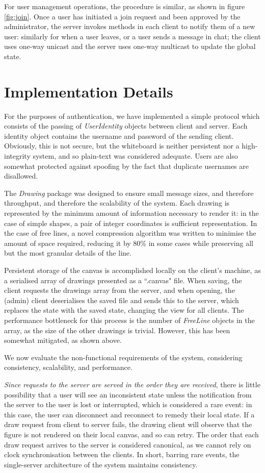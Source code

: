 \documentclass[12pt,a4paper]{article}
\begin{document}
For user management operations, the procedure is similar, as shown in figure \ref{fig:join}. Once a user has initiated a join request and been approved by the administrator, the server invokes methods in each client to notify them of a new user: similarly for when a user leaves, or a user sends a message in chat; the client uses one-way unicast and the server uses one-way multicast to update the global state. 


\section{Implementation Details}

For the purposes of authentication, we have implemented a simple protocol which consists of the passing of \textit{UserIdentity} objects between client and server. Each identity object contains the username and password of the sending client. Obviously, this is not secure, but the whiteboard is neither persistent nor a high-integrity system, and so plain-text was considered adequate. Users are also somewhat protected against spoofing by the fact that duplicate usernames are disallowed.

The \textit{Drawing} package was designed to ensure small message sizes, and therefore throughput, and therefore the scalability of the system. Each drawing is represented by the minimum amount of information necessary to render it: in the case of simple shapes, a pair of integer coordinates is sufficient representation. In the case of free lines, a novel compression algorithm was written to minimise the amount of space required, reducing it by 80\% in some cases while preserving all but the most granular details of the line. 

Persistent storage of the canvas is accomplished locally on the client's machine, as a serialised array of drawings presented as a ``.canvas" file. When saving, the client requests the drawings array from the server, and when opening, the (admin) client deserialises the saved file and sends this to the server, which replaces the state with the saved state, changing the view for all clients. The performance bottleneck for this process is the number of \textit{FreeLine} objects in the array, as the size of the other drawings is trivial. However, this has been somewhat mitigated, as shown above. 

We now evaluate the non-functional requirements of the system, considering consistency, scalability, and performance.

\textit{Since requests to the server are served in the order they are received}, there is little possibility that a user will see an inconsistent state unless the notification from the server to the user is lost or interrupted, which is considered a rare event: in this case, the user can disconnect and reconnect to remedy their local state. If a draw request from client to server fails, the drawing client will observe that the figure is not rendered on their local canvas, and so can retry. The order that each draw request arrives to the server is considered canonical, as we cannot rely on clock synchronisation between the clients. In short, barring rare events, the single-server architecture of the system maintains consistency. 
\end{document}
